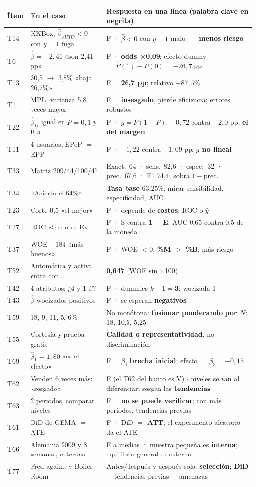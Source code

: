 \documentclass[10pt,a4paper]{article}
\newcommand{\Ph}{\hat P}
\begin{document}
\begin{tabular}{@{}p{1.1cm}p{6.6cm}p{8.7cm}@{}}\toprule
Ítem & En el caso & Respuesta en una línea (palabra clave en negrita)\\\midrule
T14 & KKBox, $\hat\beta_{AUTO}<0$ con $y=1$ fuga & F · $\hat\beta<0$ con $y=1$ malo $=$ \textbf{menos riesgo}\\
T6 & $\hat\beta=-2{,}41$ «son 2,41 pp» & F · \textbf{odds ×0,09}; efecto dummy $=\Ph(1)-\Ph(0)=-26{,}7$ pp\\
T13 & 30,5 $\to$ 3,8\% «baja 26,7\%» & F · \textbf{26,7 pp}; relativo $-87{,}5\%$\\
T1 & MPL, varianza 5,8 veces mayor & F · \textbf{insesgado}, pierde eficiencia; errores robustos\\
T22 & $\hat\beta_D$ igual en $P=0{,}1$ y $0{,}5$ & F · $g=P(1-P)$: $-0{,}72$ contra $-2{,}0$ pp; \textbf{el del margen}\\
T11 & 4 usuarios, EPeP $=$ EPP & F · $-1{,}22$ contra $-1{,}09$ pp; \textbf{$g$ no lineal}\\
T33 & Matriz 209/44/100/47 & Exact.\ 64 · sens.\ 82,6 · espec.\ 32 · prec.\ 67,6 · F1 74,4; sobra $1-$prec.\\
T34 & «Acierta el 64\%» & \textbf{Tasa base} 63,25\%; mirar sensibilidad, especificidad, AUC\\
T23 & Corte 0,5 «el mejor» & F · depende de \textbf{costos}; ROC o $\bar y$\\
T27 & ROC «S contra E» & F · S contra \textbf{1 $-$ E}; AUC 0,65 contra 0,5 de la moneda\\
T37 & WOE $-184$ «más buenos» & F · WOE $<0$: \textbf{\%M $>$ \%B}, más riesgo\\
T52 & Automática y activa entra con... & \textbf{0,647} (WOE sin ×100)\\
T42 & 4 atributos: ¿4 y 1 $\beta$? & F · dummies $k-1=\mathbf{3}$; woeizada 1\\
T43 & $\hat\beta$ woeizados positivos & F · se esperan \textbf{negativos}\\
T59 & 18, 9, 11, 5, 6\% & No monótona: \textbf{fusionar ponderando por $N$}: 18, 10,5, 5,25\\
T55 & Cortesía y prueba gratis & \textbf{Calidad o representatividad}, no discriminación\\
T69 & $\hat\beta_1=1{,}80$ «es el efecto» & F · $\beta_1$ \textbf{brecha inicial}; efecto $=\beta_3=-0{,}15$\\
T62 & Venden 6 veces más: «sesgado» & F (el T62 del banco es V) $\cdot$ niveles se van al diferenciar; sesgan las \textbf{tendencias}\\
T63 & 2 periodos, comparar niveles & F · \textbf{no se puede verificar}; con más periodos, tendencias previas\\
T61 & DiD de GEMA $=$ ATE & F · DiD $=$ \textbf{ATT}; el experimento aleatorio da el ATE\\
T66 & Alemania 2009 y 8 semanas, externas & F a medias · muestra pequeña es \textbf{interna}; equilibrio general es externa\\
T77 & Fred again.. y Boiler Room & Antes/después y después solo: \textbf{selección}; \textbf{DiD} + tendencias previas + amenazas\\\bottomrule
\end{tabular}
\end{document}
